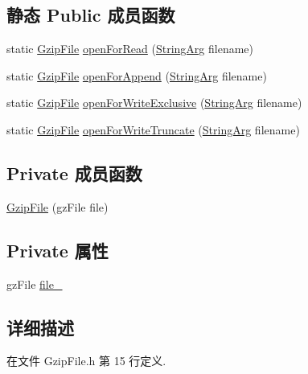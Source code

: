 \subsection*{静态 Public 成员函数}
\begin{DoxyCompactItemize}
\item 
static \hyperlink{classmuduo_1_1GzipFile}{Gzip\+File} \hyperlink{classmuduo_1_1GzipFile_a0a3314e3024363b639db1f864586647a}{open\+For\+Read} (\hyperlink{classmuduo_1_1StringArg}{String\+Arg} filename)
\item 
static \hyperlink{classmuduo_1_1GzipFile}{Gzip\+File} \hyperlink{classmuduo_1_1GzipFile_a9c729746e69ca041b116552594ddb70a}{open\+For\+Append} (\hyperlink{classmuduo_1_1StringArg}{String\+Arg} filename)
\item 
static \hyperlink{classmuduo_1_1GzipFile}{Gzip\+File} \hyperlink{classmuduo_1_1GzipFile_afc3a38fb0012c6e377aca37925f98c4f}{open\+For\+Write\+Exclusive} (\hyperlink{classmuduo_1_1StringArg}{String\+Arg} filename)
\item 
static \hyperlink{classmuduo_1_1GzipFile}{Gzip\+File} \hyperlink{classmuduo_1_1GzipFile_ab3ebedf22d289ebd69792c1590035b57}{open\+For\+Write\+Truncate} (\hyperlink{classmuduo_1_1StringArg}{String\+Arg} filename)
\end{DoxyCompactItemize}
\subsection*{Private 成员函数}
\begin{DoxyCompactItemize}
\item 
\hyperlink{classmuduo_1_1GzipFile_ab4b83a7add3f1901e7e4e0722fdd8f35}{Gzip\+File} (gz\+File file)
\end{DoxyCompactItemize}
\subsection*{Private 属性}
\begin{DoxyCompactItemize}
\item 
gz\+File \hyperlink{classmuduo_1_1GzipFile_aefa49b1eaa84765dc4afdffadb3a117d}{file\+\_\+}
\end{DoxyCompactItemize}


\subsection{详细描述}


在文件 Gzip\+File.\+h 第 15 行定义.




